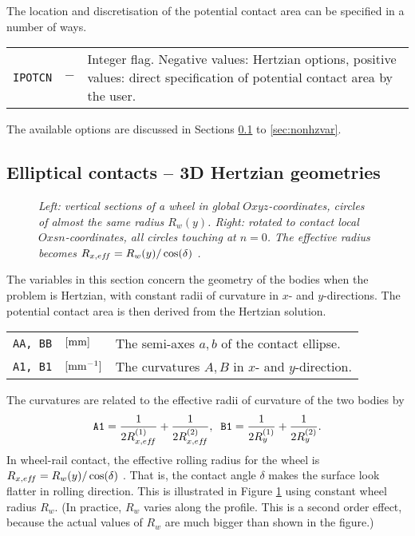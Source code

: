 \documentclass[12pt]{report}
\newenvironment{inputvars}{\vspace{0.4\baselineskip}%

\begin{tabular}{>{\raggedright}p{22mm}p{19mm}p{113mm}}}{
\end{tabular}

}
\newcommand{\inpvar}[3]{{\small\tt #1} & $#2$ & #3 \\[1ex]}
\begin{document}
The location and discretisation of the potential contact area can be
specified in a number of ways.
\begin{inputvars}
\inpvar{IPOTCN}{-}{Integer flag. Negative values: Hertzian options,
        positive values: direct specification of potential contact area
        by the user.}
\end{inputvars}
The available options are discussed in Sections \ref{sec:hertz3d} to
\ref{sec:nonhzvar}.

\subsection{Elliptical contacts -- 3D Hertzian geometries}
\label{sec:hertz3d}

\begin{figure}[bt]
\centering
{}
\caption{\em Left: vertical sections of a wheel in global
        $Oxyz$-coordinates, circles of almost the same radius $R_w(y)$.
        Right: rotated to contact local $Oxsn$-coordinates, all circles
        touching at $n=0$. The effective radius becomes $R_{x,ef\!f}=
        R_w(y)/\cos(\delta)$ \cite{Vollebregt2018b-corrigendum}.}
\label{fig:skewed_circles}
\end{figure}

The variables in this section concern the geometry of the bodies when the
problem is Hertzian, with constant radii of curvature in $x$- and
$y$-directions. The potential contact area is then derived from the
Hertzian solution.
\begin{inputvars}
\inpvar{AA, BB}{\bunit{mm}}{The semi-axes $a,b$ of the contact ellipse.}
\inpvar{A1, B1}{\bunit{mm^{-1}}}{The curvatures $A,B$ in $x$- and $y$-direction.}
\end{inputvars}
The curvatures are related to the effective radii of curvature of the two
bodies by
\begin{equation}\label{eq:a1_b1}
   {\tt A1} = \frac{1}{2 R_{x,ef\!f}^{(1)}} + \frac{1}{2 R_{x,ef\!f}^{(2)}} , \;\;
   {\tt B1} = \frac{1}{2 R_y^{(1)}} + \frac{1}{2 R_y^{(2)}} .
\end{equation}
In wheel-rail contact, the effective rolling radius for the wheel is 
$R_{x,ef\!f}=R_w(y)/\cos(\delta)$ \cite{Vollebregt2018b-corrigendum}. 
That is, the contact angle $\delta$ makes the surface look flatter in
rolling direction. This is illustrated in Figure \ref{fig:skewed_circles}
using constant wheel radius $R_w$. (In practice, $R_w$ varies along the
profile. This is a second order effect, because the actual values of $R_w$
are much bigger than shown in the figure.)
\end{document}
